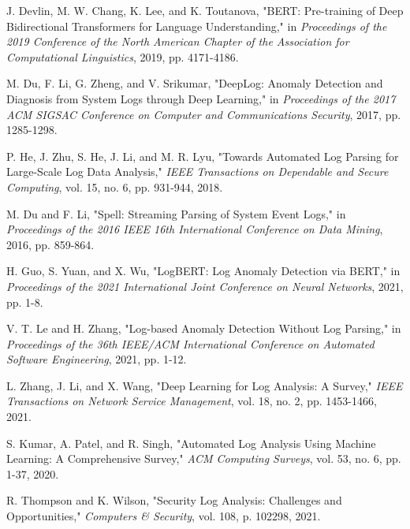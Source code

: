 \documentclass[conference]{IEEEtran}
\begin{document}
\begin{thebibliography}{00}

 J. Devlin, M. W. Chang, K. Lee, and K. Toutanova, "BERT: Pre-training of Deep Bidirectional Transformers for Language Understanding," in \textit{Proceedings of the 2019 Conference of the North American Chapter of the Association for Computational Linguistics}, 2019, pp. 4171-4186.

 M. Du, F. Li, G. Zheng, and V. Srikumar, "DeepLog: Anomaly Detection and Diagnosis from System Logs through Deep Learning," in \textit{Proceedings of the 2017 ACM SIGSAC Conference on Computer and Communications Security}, 2017, pp. 1285-1298.

 P. He, J. Zhu, S. He, J. Li, and M. R. Lyu, "Towards Automated Log Parsing for Large-Scale Log Data Analysis," \textit{IEEE Transactions on Dependable and Secure Computing}, vol. 15, no. 6, pp. 931-944, 2018.

 M. Du and F. Li, "Spell: Streaming Parsing of System Event Logs," in \textit{Proceedings of the 2016 IEEE 16th International Conference on Data Mining}, 2016, pp. 859-864.

 H. Guo, S. Yuan, and X. Wu, "LogBERT: Log Anomaly Detection via BERT," in \textit{Proceedings of the 2021 International Joint Conference on Neural Networks}, 2021, pp. 1-8.

 V. T. Le and H. Zhang, "Log-based Anomaly Detection Without Log Parsing," in \textit{Proceedings of the 36th IEEE/ACM International Conference on Automated Software Engineering}, 2021, pp. 1-12.

 L. Zhang, J. Li, and X. Wang, "Deep Learning for Log Analysis: A Survey," \textit{IEEE Transactions on Network Service Management}, vol. 18, no. 2, pp. 1453-1466, 2021.

 S. Kumar, A. Patel, and R. Singh, "Automated Log Analysis Using Machine Learning: A Comprehensive Survey," \textit{ACM Computing Surveys}, vol. 53, no. 6, pp. 1-37, 2020.

 R. Thompson and K. Wilson, "Security Log Analysis: Challenges and Opportunities," \textit{Computers \& Security}, vol. 108, p. 102298, 2021.

\end{thebibliography}
\end{document}
